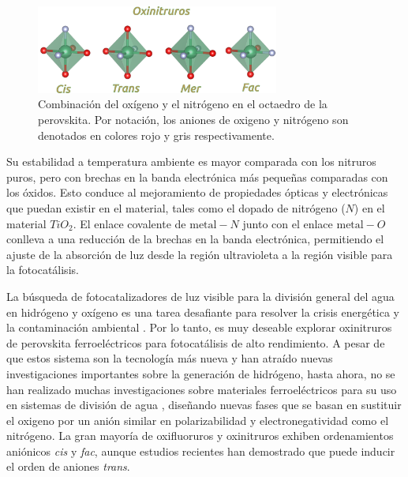 \begin{figure}[H]
    \centering
    \includegraphics[width=8.0cm,keepaspectratio=true]{Figs/cis_trans_mer_fac.png}
    \caption{Combinación del oxígeno y el nitrógeno en el octaedro de la perovskita. Por notación, los aniones de oxigeno y nitrógeno son denotados en colores rojo y gris respectivamente.}
    \label{Fig. cis_fac_mec_trans}
\end{figure}

Su estabilidad a temperatura ambiente es mayor comparada con los nitruros puros, pero con brechas en la banda electrónica más pequeñas comparadas con los óxidos. Esto conduce al mejoramiento de propiedades ópticas y electrónicas que puedan existir en el material, tales como el dopado de nitrógeno ($N$) en el material $TiO_{2}$. El enlace covalente de $\text{metal}-N$ junto con el enlace $\text{metal}-O$ conlleva a una reducción de la brechas en la banda electrónica, permitiendo el ajuste de la absorción de luz desde la región ultravioleta a la región visible\cite{Gou2020Photocatalysis} para la fotocatálisis\cite{Ebbinghaus2004,Yang2011}.

La búsqueda de fotocatalizadores de luz visible para la división general del agua en hidrógeno y oxígeno es una tarea desafiante para resolver la crisis energética y la contaminación ambiental \cite{Cen2019OptimizedSplitting}. Por lo tanto, es muy deseable explorar oxinitruros de perovskita ferroeléctricos para fotocatálisis de alto rendimiento. A pesar de que estos sistema son la tecnología más nueva y han atraído nuevas investigaciones importantes sobre la generación de hidrógeno, hasta ahora, no se han realizado muchas investigaciones sobre materiales ferroeléctricos para su uso en sistemas de división de agua \cite{Gou2020Photocatalysis}, diseñando nuevas fases que se basan en sustituir el oxigeno por un anión similar en polarizabilidad y electronegatividad como el nitrógeno\cite{Rossell2012Auth}. La gran mayoría de oxifluoruros y oxinitruros exhiben ordenamientos aniónicos \emph{cis} y \emph{fac}, aunque estudios recientes han demostrado que puede inducir el orden de aniones \emph{trans}\cite{Harada2019}.




